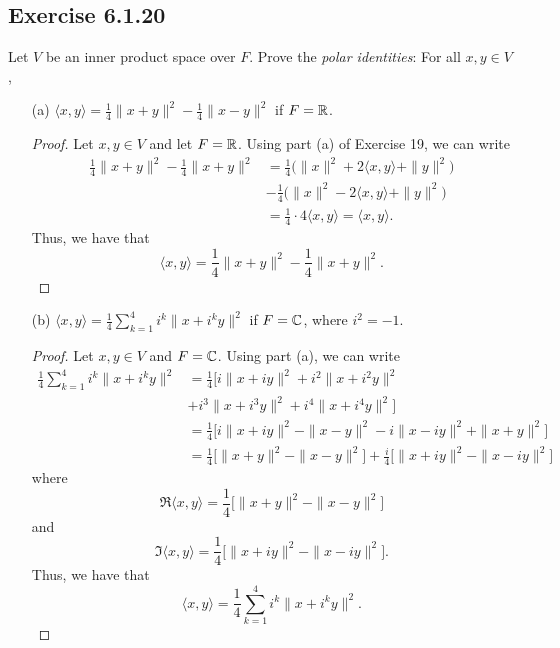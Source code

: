 \subsection*{Exercise 6.1.20} Let \( V \) be an inner product space over \( F  \). Prove the \textit{polar identities}: For all \( x,y \in V  \),  
\begin{enumerate}
    \item[(a)] \( \langle x , y \rangle = \frac{ 1 }{ 4 }  \|x + y \|^{2} - \frac{ 1 }{ 4 }  \|x - y\|^{2} \) if \( F = \mathbb{R}  \).
        \begin{proof}
        Let \( x,y \in V  \) and let \( F = \mathbb{R}  \). Using part (a) of Exercise 19, we can write
        \begin{align*}
            \frac{ 1 }{ 4 }  \|x + y\|^{2} - \frac{ 1 }{ 4 }  \|x + y\|^{2} &= \frac{ 1 }{ 4 }  \Big(  \|x\|^{2} + 2 \langle x , y \rangle + \|y\|^{2}  \Big)  \\
                                                                            &- \frac{ 1 }{ 4 }  \Big(  \|x\|^{2} - 2 \langle x , y \rangle + \|y\|^{2} \Big) \\
                                                                            &= \frac{ 1 }{ 4 }  \cdot 4 \langle x , y \rangle = \langle x , y \rangle.
        \end{align*}
        Thus, we have that
        \[  \langle x , y \rangle = \frac{ 1 }{ 4 }  \|x + y\|^{2} - \frac{ 1 }{ 4 }  \|x + y\|^{2}. \]
        \end{proof}
    \item[(b)] \( \langle x , y \rangle = \frac{ 1 }{ 4 }  \sum_{ k=1  }^{ 4  } i^{k} \|x + i^{k} y \|^{2}  \) if \( F = \mathbb{C}  \), where \( i^{2} = - 1  \).
        \begin{proof}
        Let \( x,y \in V  \) and \( F = \mathbb{C}  \). Using part (a), we can write
        \begin{align*}
            \frac{ 1 }{ 4 } \sum_{ k=1  }^{ 4  } i^{k } \|x + i^{k } y\|^{2} &= \frac{ 1 }{ 4 }  \Big[ i \|x + iy\|^{2} + i^{2} \|x + i^{2} y\|^{2} \\ 
                                                                             &+ i^{3} \|x + i^{3} y\|^{2} + i^{4} \|x + i^{4} y\|^{2} \Big]  \\
                                                                             &= \frac{ 1 }{ 4 } \Big[   i \|x + iy \|^{2} - \|x - y \|^{2} - i \|x - iy\|^{2} + \|x + y\|^{2} \Big] \\
                                                                             &= \frac{ 1 }{ 4 }  \Big[ \|x + y\|^{2} - \|x - y \|^{2} \Big] + \frac{ i }{ 4 }  \Big[ \|x + iy\|^{2} - \|x - iy\|^{2} \Big]
        \end{align*}
        where
        \[  \Re \langle x , y \rangle = \frac{ 1 }{ 4 }  \Big[ \|x + y \|^{2} - \|x - y\|^{2} \Big] \tag{part(a)} \]
        and 
        \[ \Im \langle x , y \rangle = \frac{ 1 }{ 4 }  \Big[ \|x + iy\|^{2} - \|x - iy\|^{2} \Big].   \]
        Thus, we have that
        \[  \langle x , y \rangle = \frac{ 1 }{ 4 }  \sum_{ k=1  }^{ 4  } i^{k } \|x + i^{k } y \|^{2}. \]
        \end{proof}
\end{enumerate}


